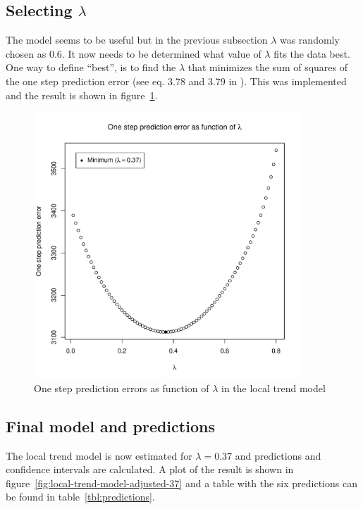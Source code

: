 \documentclass[11pt]{article}
\begin{document}
\subsection*{Selecting $\lambda$}
The model seems to be useful but in the previous subsection $\lambda$ was randomly chosen as 0.6. It now needs to be determined what value of $\lambda$ fits the data best. One way to define ``best'', is to find the $\lambda$ that minimizes the sum of squares of the one step prediction error (see eq. 3.78 and 3.79 in \cite{hm}). This was implemented and the result is shown in figure~\ref{fig:prediction-errors}.

\begin{figure}
    \centering
    \includegraphics[width=100mm]{prediction-errors.pdf}
    \caption{One step prediction errors as function of $\lambda$ in the local trend model}
    \label{fig:prediction-errors}
\end{figure}


\subsection*{Final model and predictions}
The local trend model is now estimated for $\lambda=0.37$ and predictions and confidence intervals are calculated. A plot of the result is shown in figure~\ref{fig:local-trend-model-adjusted-37} and a table with the six predictions can be found in table~\ref{tbl:predictions}.\par
\end{document}

